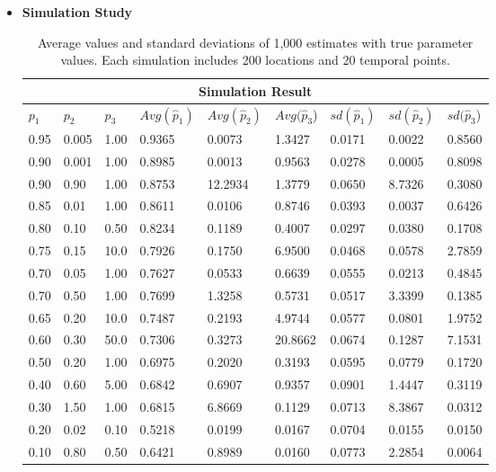 \documentclass[11pt]{article}
\begin{document}
\begin{itemize}
\pagebreak

\item \textbf{Simulation Study}\\

\begin{table}[h!]
\centering
\begin{tabular}{ |p{1cm}|p{1cm}|p{1cm}||p{1.5cm}|p{1.5cm}|p{1.5cm}||p{1.5cm}|p{1.5cm}|p{1.5cm}|}
 \hline
 \multicolumn{9}{|c|}{Simulation Result} \\
 \hline
 $p_1$ & $p_2$ & $p_3$ & $Avg(\hat{p}_1)$ & $Avg(\hat{p}_2)$  & $Avg(\hat{p}_3$)& $sd(\hat{p}_1)$ & $sd(\hat{p}_2)$  & $sd(\hat{p}_3$)\\
 \hline
 0.95& 0.005& 1.00& 0.9365& 0.0073& 1.3427& 0.0171& 0.0022& 0.8560\\ 
 0.90& 0.001& 1.00& 0.8985& 0.0013& 0.9563& 0.0278& 0.0005& 0.8098\\
 0.90& 0.90& 1.00& 0.8753& 12.2934&  1.3779& 0.0650& 8.7326& 0.3080\\
 0.85& 0.01& 1.00& 0.8611& 0.0106& 0.8746& 0.0393& 0.0037& 0.6426\\ 
 0.80& 0.10& 0.50& 0.8234& 0.1189& 0.4007& 0.0297& 0.0380& 0.1708\\ 
 0.75& 0.15& 10.0& 0.7926& 0.1750& 6.9500& 0.0468& 0.0578& 2.7859\\
 0.70& 0.05& 1.00& 0.7627& 0.0533& 0.6639& 0.0555& 0.0213& 0.4845\\
 0.70& 0.50& 1.00& 0.7699& 1.3258& 0.5731& 0.0517& 3.3399& 0.1385\\
 0.65& 0.20& 10.0& 0.7487& 0.2193& 4.9744& 0.0577& 0.0801& 1.9752\\
 0.60& 0.30& 50.0& 0.7306& 0.3273& 20.8662& 0.0674& 0.1287& 7.1531\\
 0.50& 0.20& 1.00& 0.6975& 0.2020& 0.3193& 0.0595& 0.0779& 0.1720\\
 0.40& 0.60& 5.00& 0.6842& 0.6907& 0.9357& 0.0901& 1.4447& 0.3119\\
 0.30& 1.50& 1.00& 0.6815& 6.8669& 0.1129& 0.0713& 8.3867& 0.0312\\
 0.20& 0.02& 0.10& 0.5218& 0.0199& 0.0167& 0.0704& 0.0155& 0.0150\\
 0.10& 0.80& 0.50&  0.6421& 0.8989& 0.0160& 0.0773& 2.2854& 0.0064\\
 \hline
\end{tabular}
\caption{\label{tab1} Average values and standard deviations of 1,000 estimates with true parameter values. Each simulation includes 200 locations and 20 temporal points.}
\end{table}


\end{itemize}
\end{document}
